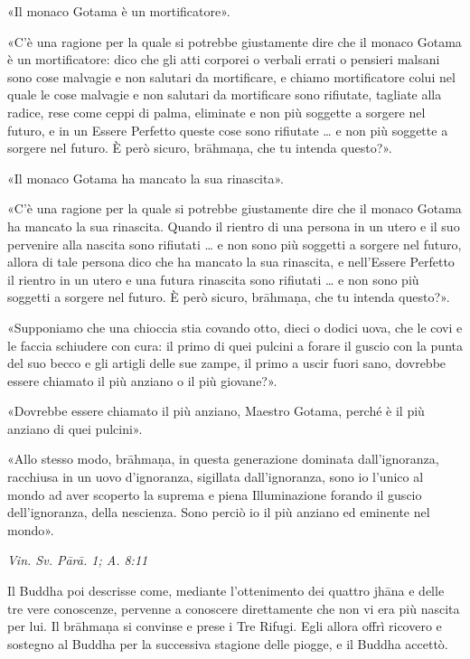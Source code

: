 «Il monaco Gotama è un mortificatore».


«C’è una ragione per la quale si potrebbe giustamente dire che il monaco
Gotama è un mortificatore: dico che gli atti corporei o verbali errati o
pensieri malsani sono cose malvagie e non salutari da mortificare, e
chiamo mortificatore colui nel quale le cose malvagie e non salutari da
mortificare sono rifiutate, tagliate alla radice, rese come ceppi di
palma, eliminate e non più soggette a sorgere nel futuro, e in un Essere
Perfetto queste cose sono rifiutate … e non più soggette a sorgere nel
futuro. È però sicuro, brāhmaṇa, che tu intenda questo?».


«Il monaco Gotama ha mancato la sua rinascita».


«C’è una ragione per la quale si potrebbe giustamente dire che il monaco
Gotama ha mancato la sua rinascita. Quando il rientro di una persona in
un utero e il suo pervenire alla nascita sono rifiutati … e non sono più
soggetti a sorgere nel futuro, allora di tale persona dico che ha
mancato la sua rinascita, e nell’Essere Perfetto il rientro in un utero
e una futura rinascita sono rifiutati … e non sono più soggetti a
sorgere nel futuro. È però sicuro, brāhmaṇa, che tu intenda questo?».


«Supponiamo che una chioccia stia covando otto, dieci o dodici uova, che
le covi e le faccia schiudere con cura: il primo di quei pulcini a
forare il guscio con la punta del suo becco e gli artigli delle sue
zampe, il primo a uscir fuori sano, dovrebbe essere chiamato il più
anziano o il più giovane?».


«Dovrebbe essere chiamato il più anziano, Maestro Gotama, perché è il
più anziano di quei pulcini».


«Allo stesso modo, brāhmaṇa, in questa generazione dominata
dall’ignoranza, racchiusa in un uovo d’ignoranza, sigillata
dall’ignoranza, sono io l’unico al mondo ad aver scoperto la suprema e
piena Illuminazione forando il guscio dell’ignoranza, della nescienza.
Sono perciò io il più anziano ed eminente nel mondo».


\emph{Vin. Sv. Pārā. 1; A. 8:11}


 Il Buddha poi descrisse come, mediante l’ottenimento
dei quattro jhāna e delle tre vere conoscenze, pervenne a conoscere
direttamente che non vi era più nascita per lui. Il brāhmaṇa si convinse
e prese i Tre Rifugi. Egli allora offrì ricovero e sostegno al Buddha
per la successiva stagione delle piogge, e il Buddha accettò.


